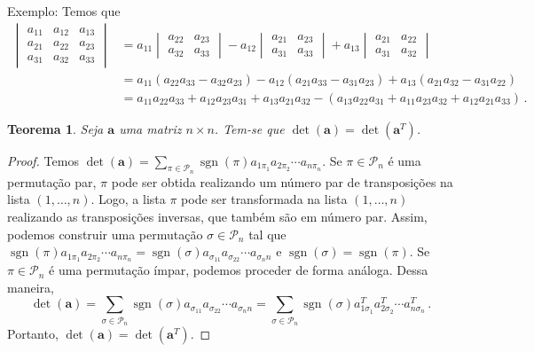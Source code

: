 \documentclass[12pt,a4paper]{report}
\newcommand{\mb}{\mathbf}
\newcommand{\mc}{\mathcal}
\newtheorem{thm}{Teorema}[chapter]
\DeclareMathOperator{\sgn}{sgn}
\begin{document}
Exemplo: Temos que
  \begin{equation*}
    \begin{split}
      \begin{vmatrix}
        a_{11}&a_{12}&a_{13}\\
        a_{21}&a_{22}&a_{23}\\
        a_{31}&a_{32}&a_{33}
      \end{vmatrix}&=a_{11}\begin{vmatrix}
        a_{22}&a_{23}\\
        a_{32}&a_{33}
      \end{vmatrix}-a_{12}\begin{vmatrix}
        a_{21}&a_{23}\\
        a_{31}&a_{33}
      \end{vmatrix}+a_{13}\begin{vmatrix}
        a_{21}&a_{22}\\
        a_{31}&a_{32}
      \end{vmatrix}\\
      &=a_{11}(a_{22}a_{33}-a_{32}a_{23})-a_{12}(a_{21}a_{33}-a_{31}a_{23})+a_{13}(a_{21}a_{32}-a_{31}a_{22})\\
      &=a_{11}a_{22}a_{33}+a_{12}a_{23}a_{31}+a_{13}a_{21}a_{32}-(a_{13}a_{22}a_{31}+a_{11}a_{23}a_{32}+a_{12}a_{21}a_{33})\,.
    \end{split}
  \end{equation*}

\begin{thm}
  Seja $\mb a$ uma matriz $n\times n$. Tem-se que $\det (\mb a)=\det (\mb a^T)$.
\end{thm}
\begin{proof}
  Temos $\det(\mb a)=\sum_{\pi\in\mc P_n}\sgn(\pi)a_{1\pi_1}a_{2\pi_2}\cdots a_{n\pi_n}$. Se $\pi\in\mc P_n$ é uma permutação par, $\pi$ pode ser obtida realizando um número par de transposições na lista $(1,\ldots,n)$. Logo, a lista $\pi$ pode ser transformada na lista $(1,\ldots,n)$ realizando as transposições inversas, que também são em número par.
  Assim, podemos construir uma permutação $\sigma\in\mc P_n$ tal que $\sgn(\pi)a_{1\pi_1}a_{2\pi_2}\cdots a_{n\pi_n}=\sgn(\sigma)a_{\sigma_11}a_{\sigma_22}\cdots a_{\sigma_nn}$ e $\sgn(\sigma)=\sgn(\pi)$. Se $\pi\in\mc P_n$ é uma permutação ímpar, podemos proceder de forma análoga. Dessa maneira,
  $$\det(\mb a)=\sum_{\sigma\in\mc P_n}\sgn(\sigma)a_{\sigma_11}a_{\sigma_22}\cdots a_{\sigma_nn}=\sum_{\sigma\in\mc P_n}\sgn(\sigma)a^T_{1\sigma_1}a^T_{2\sigma_2}\cdots a^T_{n\sigma_n}\,.$$
  Portanto, $\det(\mb a)=\det(\mb a^T)$.
\end{proof}
\end{document}
